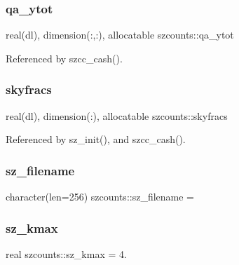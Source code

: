 \subsubsection{\texorpdfstring{qa\+\_\+ytot}{qa\_ytot}}
{\footnotesize\ttfamily real(dl), dimension(\+:,\+:), allocatable szcounts\+::qa\+\_\+ytot\hspace{0.3cm}{\ttfamily [private]}}



Referenced by szcc\+\_\+cash().

\mbox{\label{namespaceszcounts_aae1d8f46899dd92909f27129c9866db5}} 
\subsubsection{\texorpdfstring{skyfracs}{skyfracs}}
{\footnotesize\ttfamily real(dl), dimension(\+:), allocatable szcounts\+::skyfracs\hspace{0.3cm}{\ttfamily [private]}}



Referenced by sz\+\_\+init(), and szcc\+\_\+cash().

\mbox{\label{namespaceszcounts_ad7b2b406324ec451bf7199f40411f42b}} 
\subsubsection{\texorpdfstring{sz\+\_\+filename}{sz\_filename}}
{\footnotesize\ttfamily character(len=256) szcounts\+::sz\+\_\+filename = \textquotesingle{}\textquotesingle{}\hspace{0.3cm}{\ttfamily [private]}}

\mbox{\label{namespaceszcounts_a8f0eaabdc83a62e45bf24daf1e820e76}} 
\subsubsection{\texorpdfstring{sz\+\_\+kmax}{sz\_kmax}}
{\footnotesize\ttfamily real szcounts\+::sz\+\_\+kmax = 4.\hspace{0.3cm}{\ttfamily [private]}}



